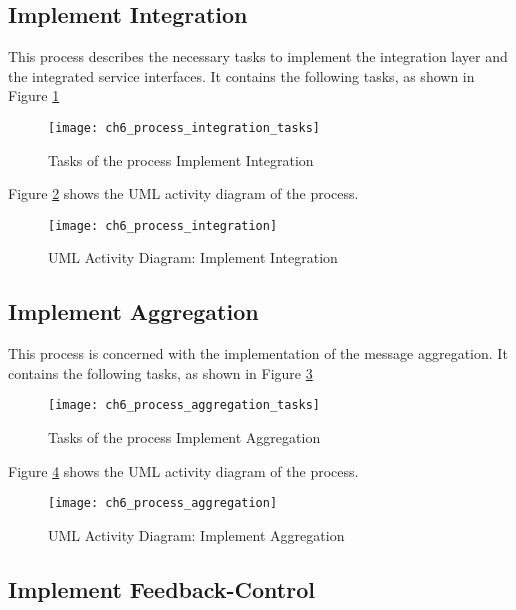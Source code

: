 \subsection{Implement Integration}
This process describes the necessary tasks to implement the integration layer and the integrated service interfaces. It contains the following tasks, as shown in Figure \ref{fig:ch6_process_integration_tasks}

\begin{figure}[htpb] \centering 
	\texttt{[image: ch6\_process\_integration\_tasks]} 
	\caption{Tasks of the process Implement Integration} 
	\label{fig:ch6_process_integration_tasks} 
\end{figure}

Figure \ref{fig:ch6_activiy_integration} shows the \ac{UML} activity diagram of the process.

\begin{figure}[htpb] \centering 
	\texttt{[image: ch6\_process\_integration]} 
	\caption{\ac{UML} Activity Diagram: Implement Integration} 
	\label{fig:ch6_activiy_integration} 
\end{figure}

\subsection{Implement Aggregation}
This process is concerned with the implementation of the message aggregation. It contains the following tasks, as shown in Figure \ref{fig:ch6_process_aggregation_tasks}

\begin{figure}[htpb] \centering 
	\texttt{[image: ch6\_process\_aggregation\_tasks]} 
	\caption{Tasks of the process Implement Aggregation} 
	\label{fig:ch6_process_aggregation_tasks} 
\end{figure}

Figure \ref{fig:ch6_activiy_aggregation} shows the \ac{UML} activity diagram of the process.

\begin{figure}[htpb] \centering 
	\texttt{[image: ch6\_process\_aggregation]} 
	\caption{\ac{UML} Activity Diagram: Implement Aggregation} 
	\label{fig:ch6_activiy_aggregation} 
\end{figure}

\subsection{Implement Feedback-Control}

